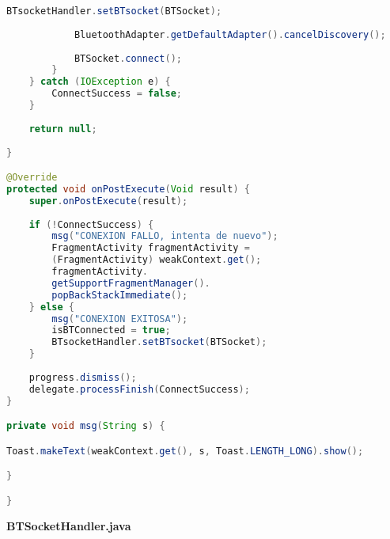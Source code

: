 \begin{lstlisting}[language=java, caption={Clase BTAsynk, para conexiónes con dispositivos bluetooth}, captionpos=b, basicstyle=\small]
			BTsocketHandler.setBTsocket(BTSocket);
			
			BluetoothAdapter.getDefaultAdapter().cancelDiscovery();
			
			BTSocket.connect();
		}
	} catch (IOException e) {
		ConnectSuccess = false;
	}
	
	return null;
	
}

@Override
protected void onPostExecute(Void result) {
	super.onPostExecute(result);
	
	if (!ConnectSuccess) {
		msg("CONEXION FALLO, intenta de nuevo");
		FragmentActivity fragmentActivity = 
		(FragmentActivity) weakContext.get();
		fragmentActivity.
		getSupportFragmentManager().
		popBackStackImmediate();
	} else {
		msg("CONEXION EXITOSA");
		isBTConnected = true;
		BTsocketHandler.setBTsocket(BTSocket);
	}
	
	progress.dismiss();
	delegate.processFinish(ConnectSuccess);
}

private void msg(String s) {

Toast.makeText(weakContext.get(), s, Toast.LENGTH_LONG).show();

}

}

\end{lstlisting}

\clearpage
\centering\textbf{BTSocketHandler.java}

